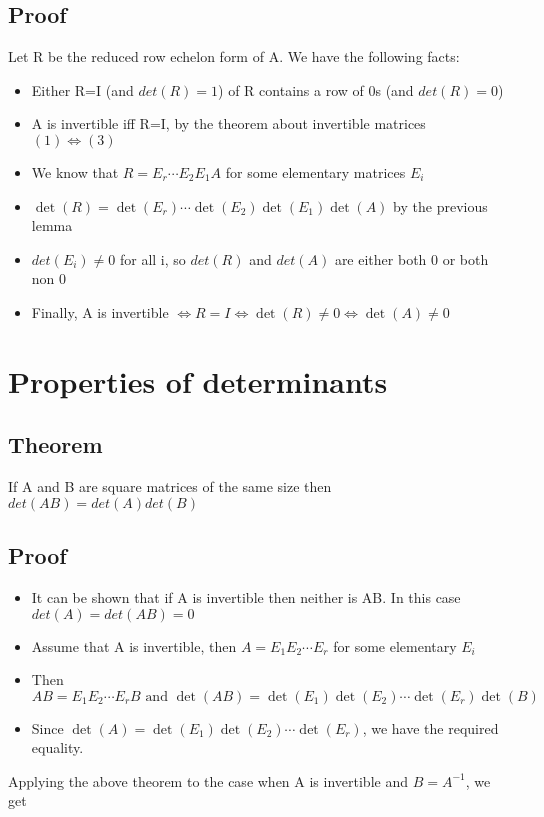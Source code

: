 \documentclass{article}[18pt]
\begin{document}
\subsection{Proof}
Let R be the reduced row echelon form of A. We have the following facts:
\begin{itemize}
	\item Either R=I (and $det(R)=1$) of R contains a row of 0s (and $det(R)=0$)
	\item A is invertible iff R=I, by the theorem about invertible matrices $(1)\Leftrightarrow (3)$
	\item We know that $R=E_r\cdots E_2E_1A$ for some elementary matrices $E_i$
	\item $\operatorname { det } ( R ) = \operatorname { det } \left( E _ { r } \right) \cdots \operatorname { det } \left( E _ { 2 } \right) \operatorname { det } \left( E _ { 1 } \right) \operatorname { det } ( A)$ by the previous lemma
	\item $det(E_i)\neq 0$ for all i, so $det(R)$ and $det(A)$ are either both 0 or both non 0
	\item Finally, A is invertible $\Leftrightarrow R = I \Leftrightarrow \operatorname { det } ( R ) \neq 0 \Leftrightarrow \operatorname { det } ( A ) \neq 0$
\end{itemize}
\section{Properties of determinants}
\subsection{Theorem}
If A and B are square matrices of the same size then $det(AB)=det(A)det(B)$
\subsection{Proof}
\begin{itemize}
	\item It can be shown that if A is invertible then neither is AB. In this case $det(A)=det(AB)=0$
	\item Assume that A is invertible, then $A=E_1E_2\cdots E_r$ for some elementary $E_i$
	\item Then $A B = E _ { 1 } E _ { 2 } \cdots E _ { r } B \text { and } \operatorname { det } ( A B ) = \operatorname { det } \left( E _ { 1 } \right) \operatorname { det } \left( E _ { 2 } \right) \cdots \operatorname { det } \left( E _ { r } \right) \operatorname { det } ( B )$
	\item Since $\operatorname { det } ( A ) = \operatorname { det } \left( E _ { 1 } \right) \operatorname { det } \left( E _ { 2 } \right) \cdots \operatorname { det } \left( E _ { r } \right)$, we have the required equality.
\end{itemize}
Applying the above theorem to the case when A is invertible and $B=A^{-1}$, we get
\end{document}
